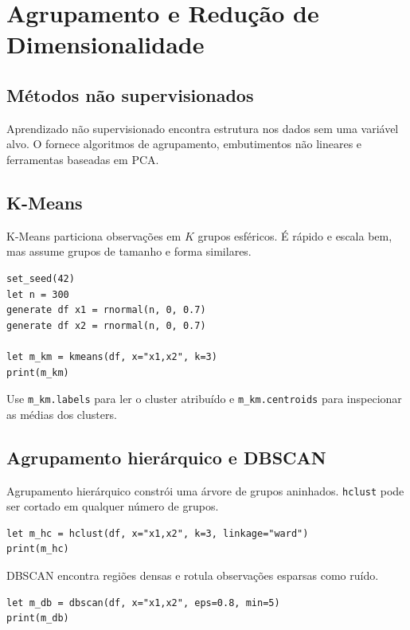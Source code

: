 \chapter{Agrupamento e Redução de Dimensionalidade}

\section{Métodos não supervisionados}

Aprendizado não supervisionado encontra estrutura nos dados sem uma
variável alvo. O \hayashi{} fornece algoritmos de agrupamento,
embutimentos não lineares e ferramentas baseadas em PCA.

\section{K-Means}

K-Means particiona observações em $K$ grupos esféricos. É rápido e
escala bem, mas assume grupos de tamanho e forma similares.

\begin{lstlisting}[caption={K-Means}]
set_seed(42)
let n = 300
generate df x1 = rnormal(n, 0, 0.7)
generate df x2 = rnormal(n, 0, 0.7)

let m_km = kmeans(df, x="x1,x2", k=3)
print(m_km)
\end{lstlisting}

Use \texttt{m\_km.labels} para ler o cluster atribuído e \texttt{m\_km.centroids} para
inspecionar as médias dos clusters.

\section{Agrupamento hierárquico e DBSCAN}

Agrupamento hierárquico constrói uma árvore de grupos aninhados.
\texttt{hclust} pode ser cortado em qualquer número de grupos.

\begin{lstlisting}[caption={Agrupamento hierárquico}]
let m_hc = hclust(df, x="x1,x2", k=3, linkage="ward")
print(m_hc)
\end{lstlisting}

DBSCAN encontra regiões densas e rotula observações esparsas como ruído.

\begin{lstlisting}[caption={DBSCAN}]
let m_db = dbscan(df, x="x1,x2", eps=0.8, min=5)
print(m_db)
\end{lstlisting}

